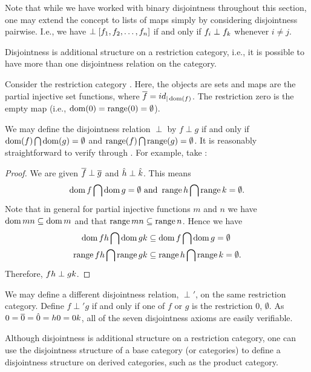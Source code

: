 Note that while we have worked with binary disjointness throughout this section, one may extend
the concept to lists of maps simply by considering disjointness pairwise. I.e., we have
$\perp [f_1,f_2,\ldots,f_n]$ if and only if $f_i \perp f_k$ whenever $i \ne j$.

Disjointness is additional structure on a restriction category, i.e., it is possible to have more
than one disjointness relation on the category.
\begin{example}\label{ex:disjointness_is_a_structure_not_a_property}
  Consider the restriction category \inj. Here, the objects are sets and maps are
  the partial injective set functions, where $\overline{f}=id_{|\operatorname*{dom}(f)}$. The restriction zero is the
  empty map (i.e., $\operatorname*{dom}(0) = \operatorname*{range}(0) = \emptyset$).

  We may define the disjointness relation $\perp$ by $f \perp g$ if and only if
  $\operatorname*{dom}(f)\bigcap\operatorname*{dom}(g)=\emptyset$ and $\operatorname*{range}(f)\bigcap\operatorname*{range}(g) = \emptyset$. It is reasonably
  straightforward to verify  through . For example, take :
  \begin{proof}
    We are given $\overline{f}\perp\overline{g}$ and $\hat{h}\perp\hat{k}$. This means
    \[
      \operatorname*{dom} f\bigcap\operatorname*{dom} g=\emptyset \text{ and }\operatorname*{range} h\bigcap\operatorname*{range} k = \emptyset.
    \]
    Note that in    general for partial injective functions $m$ and $n$ we have
    $\operatorname*{dom}{m n} \subseteq \operatorname*{dom}{m}$ and that $\operatorname*{range}{m n} \subseteq \operatorname*{range}{n}$. Hence we have
    \begin{align*}
      \operatorname*{dom}{f h}\bigcap\operatorname*{dom}{g k}&\subseteq \operatorname*{dom}{f}\bigcap \operatorname*{dom}{g}= \emptyset\\
      \operatorname*{range}{f h}\bigcap\operatorname*{range}{g k}&\subseteq \operatorname*{range}{h}\bigcap \operatorname*{range}{k}= \emptyset.
    \end{align*}
    Therefore, $f h \perp g k$.
  \end{proof}

  We may define a different disjointness relation, $\perp'$, on the same restriction category.
  Define $f \perp' g$ if and only if one of $f$ or $g$ is the restriction 0, $\emptyset$. As
  $0 = \overline{0} = \hat{0} = h 0 = 0 k$, all of the seven disjointness axioms are easily verifiable.
\end{example}

Although disjointness is additional structure on a restriction category, one can use the
disjointness structure of a base category (or categories) to define a disjointness structure
on derived categories, such as the product category.

